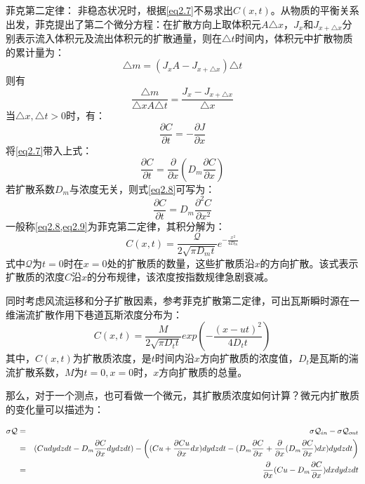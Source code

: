 \textcolor[rgb]{1,0,0}{菲克第二定律}：
非稳态状况时，根据\cref{eq2.7}不易求出$C(x,t)$。从物质的平衡关系出发，菲克提出了第二个微分方程：在扩散方向上取体积元$A\triangle x$，$J_x$和$J_{x+\triangle x}$分别表示流入体积元及流出体积元的扩散通量，则在$\triangle t$时间内，体积元中扩散物质的累计量为：
\begin{equation*}
    \triangle m = (J_xA - J_{x+\triangle x})\triangle t
\end{equation*}
则有
\begin{equation*}
    \dfrac{\triangle m}{\triangle x A \triangle t} = \dfrac{J_x-J_{x+\triangle x}}{\triangle x}
\end{equation*}
当$\triangle x, \triangle t>0$时，有：
\begin{equation*}
    \dfrac{\partial C}{\partial t} = -\dfrac{\partial J}{\partial x}
\end{equation*}
将\cref{eq2.7}带入上式：
\begin{equation}
    \dfrac{\partial C}{\partial t} = \dfrac{\partial}{\partial x}\left(D_m \dfrac{\partial C}{\partial x}\right)
    \label{eq2.8}
\end{equation}
若扩散系数$D_m$与浓度无关，则式\cref{eq2.8}可写为：
\begin{equation}
    \dfrac{\partial C}{\partial t} = D_m \dfrac{\partial^2C}{\partial x^2}
    \label{eq2.9}
\end{equation}
一般称\cref{eq2.8,eq2.9}为菲克第二定律，其积分解为：
\begin{equation}
    C(x,t) = \dfrac{\mathcal{Q}}{2\sqrt{\pi D_m t}} e^{-\frac{x^2}{4D_m}}
    \label{eq2.10}
\end{equation}
式中$\mathcal{Q}$为$t=0$时在$x=0$处的扩散质的数量，这些扩散质沿$x$的方向扩散。该式表示扩散质的浓度$C$沿$x$的分布规律，该浓度按指数规律急剧衰减。

同时考虑风流运移和分子扩散因素，参考菲克扩散第二定律，可出瓦斯瞬时源在一维湍流扩散作用下巷道瓦斯浓度分布为：
\begin{equation}
    C(x,t) = \dfrac{M}{2\sqrt{\pi D_t t}}exp(-\dfrac{(x-ut)^2}{4D_t t})
    \label{eq2.22}
\end{equation}
其中，$C(x,t)$为扩散质浓度，是$t$时间内沿$x$方向扩散质的浓度值，$D_t$是瓦斯的湍流扩散系数，$M$为$t=0,x=0$时，$x$方向扩散质的总量。

那么，对于一个测点，也可看做一个微元，其扩散质浓度如何计算？微元内扩散质的变化量可以描述为：

\begin{eqnarray}
    \sigma \mathcal{Q} &=& \sigma \mathcal{Q}_{in} - \sigma \mathcal{Q}_{out} \notag \\
    &=& (Cudydzdt - D_m\dfrac{\partial C}{\partial x}dydzdt) - \left( (Cu+\dfrac{\partial Cu}{\partial x}dx)dydzdt-(D_m \dfrac{\partial C}{\partial x} + \dfrac{\partial}{\partial x}(D_m \dfrac{\partial C}{\partial x})dx)dydzdt \right) \notag \\
    &=& \dfrac{\partial}{\partial x}(Cu- D_m \dfrac{\partial C}{\partial x})dxdydzdt
    \label{eq-diffuseness}
\end{eqnarray}
 

